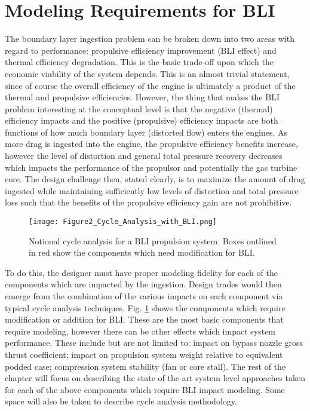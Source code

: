 	\section{Modeling Requirements for BLI}
		The boundary layer ingestion problem can be broken down into two areas with regard to performance:  propulsive efficiency improvement (BLI effect) and thermal efficiency degradation.  This is the basic trade-off upon which the economic viability of the system depends.  This is an almost trivial statement, since of course the overall efficiency of the engine is ultimately a product of the thermal and propulsive efficiencies.  However, the thing that makes the BLI problem interesting at the conceptual level is that the negative (thermal) efficiency impacts and the positive (propulsive) efficiency impacts are both functions of how much boundary layer (distorted flow) enters the engines.  As more drag is ingested into the engine, the propulsive efficiency benefits increase, however the level of distortion and general total pressure recovery decreases which impacts the performance of the propulsor and potentially the gas turbine core.  The design challenge then, stated clearly, is to maximize the amount of drag ingested while maintaining sufficiently low levels of distortion and total pressure loss such that the benefits of the propulsive efficiency gain are not prohibitive.  
		\begin{figure}[htpb]
			\centering
			\texttt{[image: Figure2\_Cycle\_Analysis\_with\_BLI.png]}
			\caption{Notional cycle analysis for a BLI propulsion system.  Boxes outlined in red show the components which need modification for BLI.}
			\label{BLI_changes}
		\end{figure}
		To do this, the designer must have proper modeling fidelity for each of the components which are impacted by the ingestion.  Design trades would then emerge from the combination of the various impacts on each component via typical cycle analysis techniques.  Fig. \ref{BLI_changes} shows the components which require modification or addition for BLI.  These are the most basic components that require modeling, however there can be other effects which impact system performance.  These include but are not limited to: impact on bypass nozzle gross thrust coefficient; impact on propulsion system weight relative to equivalent podded case; compression system stability (fan or core stall).
		The rest of the chapter will focus on describing the state of the art system level approaches taken for each of the above components which require BLI impact modeling.  Some space will also be taken to describe cycle analysis methodology.   
	
